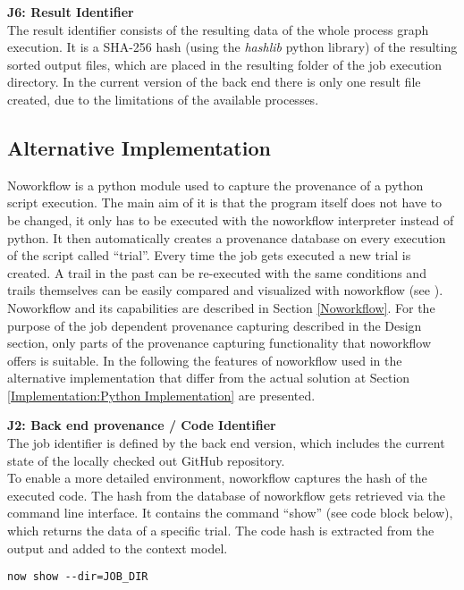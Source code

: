 \documentclass[draft,final]{vutinfth} %
\begin{document}
\textbf{J6: Result Identifier } \\
The result identifier consists of the resulting data of the whole process graph execution. It is a SHA-256 hash (using the \textit{hashlib} python library) of the resulting sorted output files, which are placed in the resulting folder of the job execution directory. In the current version of the back end there is only one result file created, due to the limitations of the available processes. 


\subsection{Alternative Implementation}\label{Implementation:Noworkflow Implementation}
Noworkflow is a python module used to capture the provenance of a python script execution. The main aim of it is that the program itself does not have to be changed, it only has to be executed with the noworkflow interpreter instead of python. It then automatically creates a provenance database on every execution of the script called “trial”. Every time the job gets executed a new trial is created. A trail in the past can be re-executed with the same conditions and trails themselves can be easily compared and visualized with noworkflow (see \cite{c9e0604becba42af96a9cb0a6f60018b}). Noworkflow and its capabilities are described in Section \ref{Noworkflow}. 
For the purpose of the job dependent provenance capturing described in the Design section, only parts of the provenance capturing functionality that noworkflow offers is suitable. In the following the features of noworkflow used in the alternative implementation that differ from the actual solution at Section \ref{Implementation:Python Implementation} are presented.    


\textbf{J2: Back end provenance / Code Identifier} \\
The job identifier is defined by the back end version, which includes the current state of the locally checked out GitHub repository.\\
To enable a more detailed environment, noworkflow captures the hash of the executed code. The hash from the database of noworkflow gets retrieved via the command line interface. It contains the command “show” (see code block below), which returns the data of a specific trial. The code hash is extracted from the output and added to the context model. 

\begin{lstlisting}[frame=single]
now show --dir=JOB_DIR
\end{lstlisting}
\end{document}
